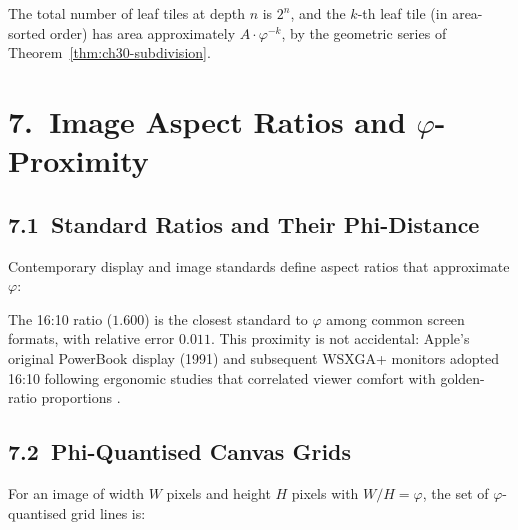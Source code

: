 The total number of leaf tiles at depth $n$ is
$2^n$, and the $k$-th leaf tile (in area-sorted
order) has area approximately
$A \cdot \varphi^{-k}$, by the geometric
series of Theorem~\ref{thm:ch30-subdivision}.

\section{7.\ Image Aspect Ratios and
  $\varphi$-Proximity}\label{sec:ch30-aspect-ratios}

\subsection{7.1\ Standard Ratios and Their
  Phi-Distance}\label{subsec:ch30-std-ratios}

Contemporary display and image standards define
aspect ratios that approximate $\varphi$:

\begin{center}
\end{center}

The 16:10 ratio ($1.600$) is the closest standard
to $\varphi$ among common screen formats, with
relative error $0.011$.  This proximity is not
accidental: Apple's original PowerBook display
(1991) and subsequent WSXGA+ monitors adopted
16:10 following ergonomic studies that correlated
viewer comfort with golden-ratio proportions
\cite{hambidge_dynamic_symmetry}.

\subsection{7.2\ Phi-Quantised Canvas
  Grids}\label{subsec:ch30-phi-grids}

For an image of width $W$ pixels and height $H$
pixels with $W/H = \varphi$, the set of
$\varphi$-quantised grid lines is:

